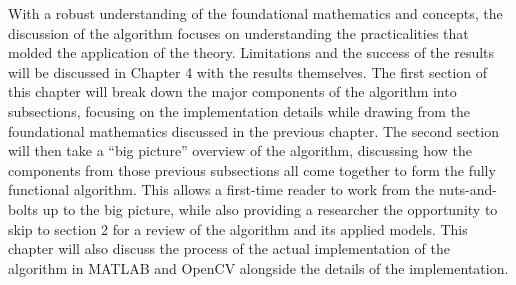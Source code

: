 %
%
%
%
%
%
%
%
%

%
%
%



With a robust understanding of the foundational mathematics and concepts, the discussion of the algorithm focuses on understanding the practicalities that molded the application of the theory. Limitations and the success of the results will be discussed in Chapter 4 with the results themselves. The first section of this chapter will break down the major components of the algorithm into subsections, focusing on the implementation details while drawing from the foundational mathematics discussed in the previous chapter. The second section will then take a ``big picture'' overview of the algorithm, discussing how the components from those previous subsections all come together to form the fully functional algorithm. This allows a first-time reader to work from the nuts-and-bolts up to the big picture, while also providing a researcher the opportunity to skip to section 2 for a review of the algorithm and its applied models. This chapter will also discuss the process of the actual implementation of the algorithm in MATLAB\textsuperscript{\textregistered} and OpenCV alongside the details of the implementation.



